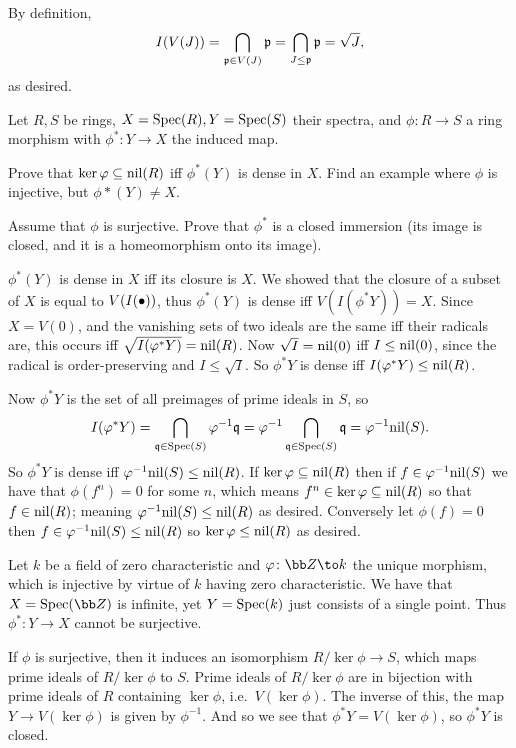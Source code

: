     By definition,
    $$ I(V(J)) = \bigcap_{{{\frak p}}\in V(J)}{{\frak p}} = \bigcap_{J\leq{{\frak p}}}{{\frak p}} = \sqrt J, $$
    as desired.
\eenum

\bprob

    Let $R,S$ be rings, $X={\rm Spec}(R),Y={\rm Spec}(S)$ their spectra, and $\phi\colon R\to S$ a ring morphism with $\phi^*\colon Y\to X$ the induced
    map.
    \benum
        \item Prove that $\mathop{\rm ker}\varphi\subseteq{\rm nil}(R)$ iff $\phi^*(Y)$ is dense in $X$.
        Find an example where $\phi$ is injective, but $\phi*(Y)\neq X$.

        \item Assume that $\phi$ is surjective.
        Prove that $\phi^*$ is a closed immersion (its image is closed, and it is a homeomorphism onto its image).
    \eenum

\eprob

\benum
    \item $\phi^*(Y)$ is dense in $X$ iff its closure is $X$.
    We showed that the closure of a subset of $X$ is equal to $V(I(\bullet))$, thus $\phi^*(Y)$ is dense iff $V(I(\phi^*Y))=X$.
    Since $X=V(0)$, and the vanishing sets of two ideals are the same iff their radicals are, this occurs iff $\sqrt{I(\varphi^*Y)}={\rm nil}(R)$.
    Now $\sqrt I={\rm nil}(0)$ iff $I\leq{\rm nil}(0)$, since the radical is order-preserving and $I\leq\sqrt I$.
    So $\phi^*Y$ is dense iff $I(\varphi^*Y)\leq{\rm nil}(R)$.

    Now $\phi^*Y$ is the set of all preimages of prime ideals in $S$, so
    $$ I(\varphi^*Y) = \bigcap_{{{\frak q}}\in{\rm Spec}(S)}\varphi^{-1}{{\frak q}} = \varphi^{-1}\bigcap_{{{\frak q}}\in{\rm Spec}(S)}{{\frak q}} = \varphi^{-1}{\rm nil}(S) . $$
    So $\phi^*Y$ is dense iff $\varphi^{-1}{\rm nil}(S)\leq{\rm nil}(R)$.
    If $\mathop{\rm ker}\varphi\subseteq{\rm nil}(R)$ then if $f\in\varphi^{-1}{\rm nil}(S)$ we have that $\phi(f^n)=0$ for some $n$, which means $f^n\in\mathop{\rm ker}\varphi\subseteq{\rm nil}(R)$
    so that $f\in{\rm nil}(R)$; meaning $\varphi^{-1}{\rm nil}(S)\leq{\rm nil}(R)$ as desired.
    Conversely let $\phi(f)=0$ then $f\in\varphi^{-1}{\rm nil}(S)\leq{\rm nil}(R)$ so $\mathop{\rm ker}\varphi\leq{\rm nil}(R)$ as desired.

    Let $k$ be a field of zero characteristic and $\phi\colon\bZ\to k$ the unique morphism, which is injective by virtue of $k$ having zero characteristic.
    We have that $X=\spec(\bZ)$ is infinite, yet $Y={\rm Spec}(k)$ just consists of a single point.
    Thus $\phi^*\colon Y\to X$ cannot be surjective.

    \item If $\phi$ is surjective, then it induces an isomorphism $R/\ker\phi\to S$, which maps prime ideals of $R/\ker\phi$ to $S$.
    Prime ideals of $R/\ker\phi$ are in bijection with prime ideals of $R$ containing $\ker\phi$, i.e.\ $V(\ker\phi)$.
    The inverse of this, the map $Y\to V(\ker\phi)$ is given by $\phi^{-1}$.
    And so we see that $\phi^*Y=V(\ker\phi)$, so $\phi^*Y$ is closed.

